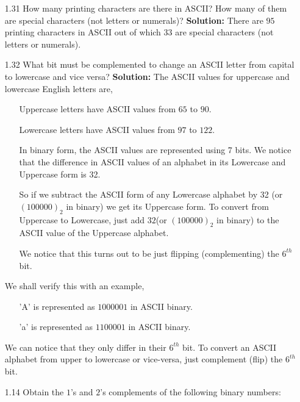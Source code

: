 \documentclass[a4paper,12pt]{article}
\begin{document}
\begin{enumerate}
\item[1.31] How many printing characters are there in ASCII? How many of them are special characters (not letters or numerals)?\newline
\textbf{Solution:}\newline
There are $95$ printing characters in ASCII out of which $33$ are special characters (not letters or numerals).
\item[1.32] What bit must be complemented to change an ASCII letter from capital to lowercase and vice versa?\newline
\textbf{Solution:}\newline
The ASCII values for uppercase and lowercase English letters are,
\begin{itemize}
    \item[\ding{105}] Uppercase letters have ASCII values from $65$ to $90$.
    \item[\ding{105}] Lowercase letters have ASCII values from $97$ to $122$.
\end{itemize}
\begin{itemize}
\item[\ding{221}] In binary form, the ASCII values are represented using 7 bits. We notice that the difference in ASCII values of an alphabet in its Lowercase and Uppercase form is 32. 
\item[\ding{221}] So if we subtract the ASCII form of any Lowercase alphabet by 32 (or $(100000)_2$ in binary) we get its Uppercase form. To convert from Uppercase to Lowercase, just add $32$(or $(100000)_2$ in binary) to the ASCII value of the Uppercase alphabet.
\item[\ding{221}] We notice that this turns out to be just flipping (complementing) the $6^{th}$ bit.
  \end{itemize}
  We shall verify this with an example,
  \begin{itemize}
    \item[\ding{105}] 'A' is represented as $1000001$ in ASCII binary.
    \item [\ding{105}]'a' is represented as $1100001$ in ASCII binary.
\end{itemize}
We can notice that they only differ in their $6^{th}$ bit.\newline
To convert an ASCII alphabet from upper to lowercase or vice-versa, just complement (flip) the $6^{th}$ bit.
  \item[1.14] Obtain the $1$'s and $2$'s complements of the following binary numbers:
\begin{enumerate}

\end{enumerate}
\end{enumerate}
\end{document}
